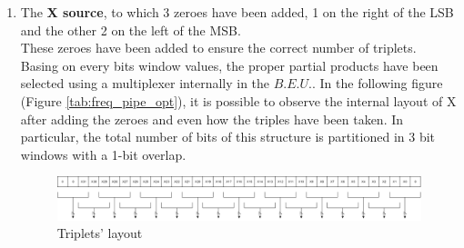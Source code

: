 \documentclass[a4paper, titlepage]{article}
\begin{document}
\begin{enumerate}
    \item The \textbf{X source}, to which 3 zeroes have been added, 1 on the right of the LSB
    and the other 2 on the left of the MSB.\\
    These zeroes have been added to ensure %
    the correct number of triplets. Basing on every bits window values, the proper partial products have been selected using a multiplexer internally in the $B.E.U.$.
    In the following figure (Figure \ref{tab:freq_pipe_opt}), it is possible to observe the internal layout of X after adding the zeroes and even how the triples have been taken. In particular, the total number of bits of this structure is partitioned in 3 bit windows with a 1-bit overlap.
    \newpage
    \begin{figure}[htp]
    \centering
    \includegraphics[scale=0.28]{x_triplets.png}
	\caption{Triplets' layout}
	\label{fig:X triplets}
    \end{figure}
   

\end{enumerate}
\end{document}
